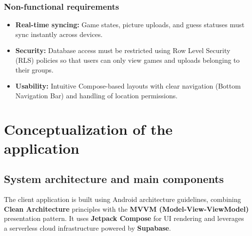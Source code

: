 \documentclass[11pt,a4paper]{article}
\begin{document}
\subsubsection{Non-functional requirements}
\begin{itemize}
    \item \textbf{Real-time syncing:} Game states, picture uploads, and guess statuses must sync instantly across devices.
    \item \textbf{Security:} Database access must be restricted using Row Level Security (RLS) policies so that users can only view games and uploads belonging to their groups.
    \item \textbf{Usability:} Intuitive Compose-based layouts with clear navigation (Bottom Navigation Bar) and handling of location permissions.
\end{itemize}

\newpage

\section{Conceptualization of the application}

\subsection{System architecture and main components}
The client application is built using Android architecture guidelines, combining \textbf{Clean Architecture} principles with the \textbf{MVVM (Model-View-ViewModel)} presentation pattern. It uses \textbf{Jetpack Compose} for UI rendering and leverages a serverless cloud infrastructure powered by \textbf{Supabase}.
\end{document}
